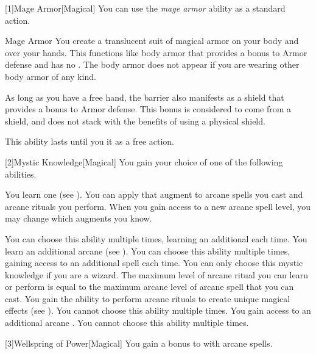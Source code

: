         [1]{Mage Armor}[Magical] You can use the \textit{mage armor} ability as a standard action.
        \begin{freeability}{Mage Armor}
            You create a translucent suit of magical armor on your body and over your hands.
            This functions like body armor that provides a  bonus to Armor defense and has no .
            The body armor does not appear if you are wearing other body armor of any kind.

            As long as you have a free hand, the barrier also manifests as a shield that provides a  bonus to Armor defense.
            This bonus is considered to come from a shield, and does not stack with the benefits of using a physical shield.

            This ability lasts until you  it as a free action.
        \end{freeability}

        [2]{Mystic Knowledge}[Magical]
        You gain your choice of one of the following abilities.
        {
             You learn one  (see ).
                You can apply that augment to arcane spells you cast and arcane rituals you perform.
                When you gain access to a new arcane spell level, you may change which augments you know.
                \par You can choose this ability multiple times, learning an additional  each time.
             You learn an additional arcane  (see ).
                You can choose this ability multiple times, gaining access to an additional spell each time.
             You can only choose this mystic knowledge if you are a wizard.
                The maximum level of arcane ritual you can learn or perform is equal to the maximum arcane level of arcane spell that you can cast.
                You gain the ability to perform arcane rituals to create unique magical effects (see ).
                You cannot choose this ability multiple times.
             You gain access to an additional arcane .
                You cannot choose this ability multiple times.
        }

        [3]{Wellspring of Power}[Magical]
        You gain a  bonus to  with arcane spells.

